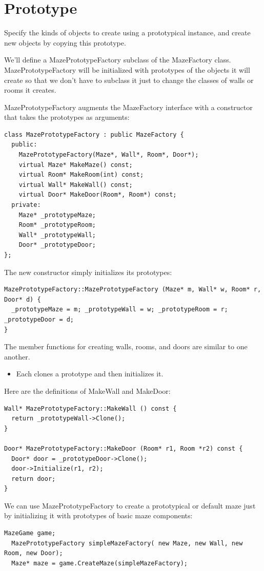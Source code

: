 \documentclass[11pt]{report}
\begin{document}
\section{Prototype}

 Specify the kinds of objects to create 
using a prototypical instance, and create new objects by copying this prototype.

We'll define a MazePrototypeFactory subclass of the MazeFactory class. 
MazePrototypeFactory will be initialized with prototypes of the objects 
it will create so that we don't have to subclass it just to change the 
classes of walls or rooms it creates.  

MazePrototypeFactory augments 
the MazeFactory interface with a constructor that 
takes the prototypes as arguments:
\begin{lstlisting}
class MazePrototypeFactory : public MazeFactory {
  public:
    MazePrototypeFactory(Maze*, Wall*, Room*, Door*);
    virtual Maze* MakeMaze() const;
    virtual Room* MakeRoom(int) const;
    virtual Wall* MakeWall() const;
    virtual Door* MakeDoor(Room*, Room*) const;
  private:
    Maze* _prototypeMaze;
    Room* _prototypeRoom;
    Wall* _prototypeWall;
    Door* _prototypeDoor;
};
\end{lstlisting}

The new constructor simply initializes its prototypes:
\begin{lstlisting}
MazePrototypeFactory::MazePrototypeFactory (Maze* m, Wall* w, Room* r, Door* d) {
  _prototypeMaze = m; _prototypeWall = w; _prototypeRoom = r; _prototypeDoor = d;
}
\end{lstlisting}

The member functions for creating walls, rooms, and doors are similar to one another. 
\begin{itemize}
\item Each clones a prototype and then initializes it. 
\end{itemize}
Here are the definitions of MakeWall and MakeDoor:
\begin{lstlisting}
Wall* MazePrototypeFactory::MakeWall () const {
  return _prototypeWall->Clone();
}

Door* MazePrototypeFactory::MakeDoor (Room* r1, Room *r2) const {
  Door* door = _prototypeDoor->Clone();
  door->Initialize(r1, r2);
  return door;
}
\end{lstlisting}

We can use MazePrototypeFactory to create a prototypical or default 
maze just by initializing it with prototypes of basic maze components:
\begin{lstlisting}
MazeGame game;
  MazePrototypeFactory simpleMazeFactory( new Maze, new Wall, new Room, new Door);
  Maze* maze = game.CreateMaze(simpleMazeFactory);
\end{lstlisting}
\end{document}
